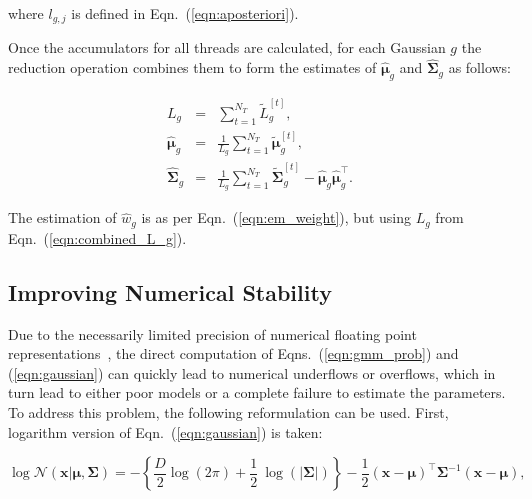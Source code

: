 \documentclass[10pt,a4paper]{article}
\def\Vec#1{{\boldsymbol{#1}}}
\def\Mat#1{{\boldsymbol{#1}}}
\begin{document}
\vspace{-2ex}
where $l_{g,j}$ is defined in Eqn.~(\ref{eqn:aposteriori}).

Once the accumulators for all threads are calculated,
for each Gaussian $g$ the reduction operation combines them to form the estimates of $\widehat{\Vec{\mu}}_g$ and $\widehat{\Mat{\Sigma}}_g$ as follows:

\vspace{-3ex}
\begin{eqnarray}
  L_g                      & = & \sum\nolimits_{t=1}^{N_T} \widetilde{L}_g^{[t]},                           \label{eqn:combined_L_g} \\
  \widehat{\Vec{\mu}}_g    & = & \frac{1}{L_g} \sum\nolimits_{t=1}^{N_T} \widetilde{\Vec{\mu}}_g^{[t]},                              \\
  \widehat{\Mat{\Sigma}}_g & = & \frac{1}{L_g} \sum\nolimits_{t=1}^{N_T} \widetilde{\Mat{\Sigma}}_g^{[t]} - \widehat{\Vec{\mu}}_g \widehat{\Vec{\mu}}_g^\top.
\end{eqnarray}

\vspace{-2ex}
The estimation of $\widehat{w}_g$ is as per Eqn.~(\ref{eqn:em_weight}), but using $L_g$ from Eqn.~(\ref{eqn:combined_L_g}).

\subsection{Improving Numerical Stability}

Due to the necessarily limited precision of numerical floating point representations~\cite{Goldberg_1991,Monniaux_2008},
the direct computation of Eqns.~(\ref{eqn:gmm_prob}) and (\ref{eqn:gaussian}) can quickly lead to numerical underflows or overflows,
which in turn lead to either poor models or a complete failure to estimate the parameters.
To address this problem, the following reformulation can be used.
First, logarithm version of Eqn.~(\ref{eqn:gaussian}) is taken:

\vspace{-3ex}
\begin{equation}
  \log {{\mathcal{N}}}( \Vec{x} | \Vec{\mu}, \Mat{\Sigma} )
  = -\left\{\frac{D}{2} \log \left( 2\pi \right) + \frac{1}{2} ~ \log ( |\Mat{\Sigma}| ) \right\}
    -\frac{1}{2} (\Vec{x}-\Vec{\mu})^\top \Mat{\Sigma}^{-1} (\Vec{x}-\Vec{\mu}),
\end{equation}
\end{document}
